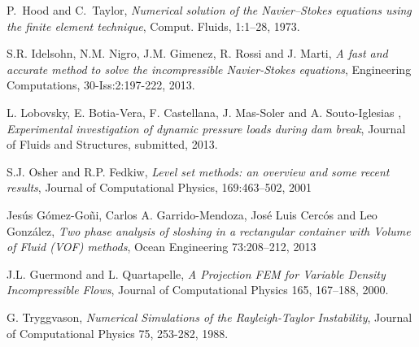 \documentclass[a4paper,conference]{IEEEtran}
\begin{document}
\begin{thebibliography}{99}

P.~Hood and C.~Taylor, \emph{Numerical solution of the Navier–Stokes equations using the finite
element technique}, Comput. Fluids, 1:1–28, 1973.

S.R. Idelsohn, N.M. Nigro, J.M. Gimenez, R. Rossi and J. Marti, \emph{A fast and accurate method to solve the incompressible Navier-Stokes equations}, Engineering Computations, 30-Iss:2:197-222, 2013.

L. Lobovsky, E. Botia-Vera, F. Castellana, J. Mas-Soler and A. Souto-Iglesias , \emph{Experimental investigation of dynamic pressure loads during dam break}, Journal of Fluids and Structures, submitted, 2013.


S.J. Osher and R.P. Fedkiw, \emph{Level set methods: an overview and some recent results}, Journal of Computational Physics, 169:463–502, 2001

Jes\'us G\'omez-Go\~ni, Carlos A. Garrido-Mendoza, Jos\'e Luis Cerc\'os and Leo Gonz\'alez, \emph{Two phase analysis of sloshing in a rectangular container with Volume of Fluid (VOF) methods}, Ocean Engineering 73:208–212, 2013

J.L. Guermond and L. Quartapelle, \emph{A Projection FEM for Variable Density Incompressible Flows}, Journal of Computational Physics 165, 167–188, 2000.

G. Tryggvason, \emph{Numerical Simulations of the Rayleigh-Taylor Instability}, Journal of Computational Physics 75, 253-282, 1988.

\end{thebibliography}


\end{document}
